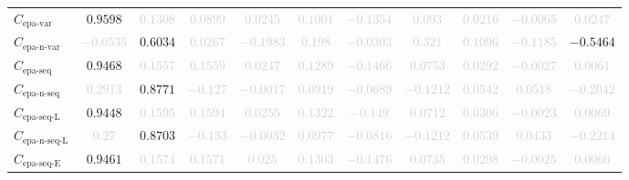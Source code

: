 \documentclass{standalone}
\newcommand{\epavariantname}{\text{epa-var}}
\newcommand{\epavariant}{C_{\epavariantname}}
\newcommand{\epanormvariantname}{\text{epa-n-var}}
\newcommand{\epanormvariant}{C_{\epanormvariantname}}
\newcommand{\epasequencename}{\text{epa-seq}}
\newcommand{\epasequence}{C_{\epasequencename}}
\newcommand{\epanormsequencename}{\text{epa-n-seq}}
\newcommand{\epanormsequence}{C_{\epanormsequencename}}
\newcommand{\epasequencelname}{\text{epa-seq-L}}
\newcommand{\epasequencel}{C_{\epasequencelname}}
\newcommand{\epanormsequencelname}{\text{epa-n-seq-L}}
\newcommand{\epanormsequencel}{C_{\epanormsequencelname}}
\newcommand{\epasequenceename}{\text{epa-seq-E}}
\newcommand{\epasequencee}{C_{\epasequenceename}}
\begin{document}
\begin{tabular}{lcccccccccc}
$\epavariant$ & $0.9598$ & \textcolor{lightgray}{$0.1308$} & \textcolor{lightgray}{$0.0899$} & \textcolor{lightgray}{$0.0245$} & \textcolor{lightgray}{$0.1001$} & \textcolor{lightgray}{$-0.1354$} & \textcolor{lightgray}{$0.093$} & \textcolor{lightgray}{$0.0216$} & \textcolor{lightgray}{$-0.0065$} & \textcolor{lightgray}{$0.0247$} \\ 
$\epanormvariant$ & \textcolor{lightgray}{$-0.0535$} & $0.6034$ & \textcolor{lightgray}{$0.0267$} & \textcolor{lightgray}{$-0.1983$} & \textcolor{lightgray}{$0.198$} & \textcolor{lightgray}{$-0.0303$} & \textcolor{lightgray}{$0.321$} & \textcolor{lightgray}{$0.1096$} & \textcolor{lightgray}{$-0.1185$} & $-0.5464$ \\ 
$\epasequence$ & $0.9468$ & \textcolor{lightgray}{$0.1557$} & \textcolor{lightgray}{$0.1559$} & \textcolor{lightgray}{$0.0247$} & \textcolor{lightgray}{$0.1289$} & \textcolor{lightgray}{$-0.1466$} & \textcolor{lightgray}{$0.0753$} & \textcolor{lightgray}{$0.0292$} & \textcolor{lightgray}{$-0.0027$} & \textcolor{lightgray}{$0.0061$} \\ 
$\epanormsequence$ & \textcolor{lightgray}{$0.2913$} & $0.8771$ & \textcolor{lightgray}{$-0.127$} & \textcolor{lightgray}{$-0.0017$} & \textcolor{lightgray}{$0.0919$} & \textcolor{lightgray}{$-0.0689$} & \textcolor{lightgray}{$-0.1212$} & \textcolor{lightgray}{$0.0542$} & \textcolor{lightgray}{$0.0518$} & \textcolor{lightgray}{$-0.2042$} \\ 
$\epasequencel$ & $0.9448$ & \textcolor{lightgray}{$0.1595$} & \textcolor{lightgray}{$0.1594$} & \textcolor{lightgray}{$0.0255$} & \textcolor{lightgray}{$0.1322$} & \textcolor{lightgray}{$-0.149$} & \textcolor{lightgray}{$0.0712$} & \textcolor{lightgray}{$0.0306$} & \textcolor{lightgray}{$-0.0023$} & \textcolor{lightgray}{$0.0069$} \\ 
$\epanormsequencel$ & \textcolor{lightgray}{$0.27$} & $0.8703$ & \textcolor{lightgray}{$-0.133$} & \textcolor{lightgray}{$-0.0032$} & \textcolor{lightgray}{$0.0977$} & \textcolor{lightgray}{$-0.0816$} & \textcolor{lightgray}{$-0.1212$} & \textcolor{lightgray}{$0.0539$} & \textcolor{lightgray}{$0.0433$} & \textcolor{lightgray}{$-0.2214$} \\ 
$\epasequencee$ & $0.9461$ & \textcolor{lightgray}{$0.1574$} & \textcolor{lightgray}{$0.1571$} & \textcolor{lightgray}{$0.025$} & \textcolor{lightgray}{$0.1303$} & \textcolor{lightgray}{$-0.1476$} & \textcolor{lightgray}{$0.0735$} & \textcolor{lightgray}{$0.0298$} & \textcolor{lightgray}{$-0.0025$} & \textcolor{lightgray}{$0.0066$} \\ 

\end{tabular}
\end{document}
